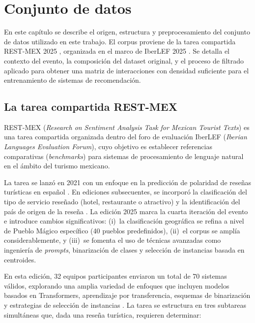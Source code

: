 \chapter{Conjunto de datos} \label{chap:dataset}

En este capítulo se describe el origen, estructura y preprocesamiento del conjunto de datos utilizado en este trabajo. El corpus proviene de la tarea compartida REST-MEX 2025 \citep{alvarez-carmona_overview_2025}, organizada en el marco de IberLEF 2025 \citep{gonzalez-barba_overview_2025}. Se detalla el contexto del evento, la composición del dataset original, y el proceso de filtrado aplicado para obtener una matriz de interacciones con densidad suficiente para el entrenamiento de sistemas de recomendación.

\section{La tarea compartida REST-MEX} \label{sec:restmex}

REST-MEX (\textit{Research on} \textit{Sentiment Analysis} \textit{Task} \textit{for Mexican Tourist Texts}) es una tarea compartida organizada dentro del foro de evaluación IberLEF (\textit{Iberian Languages Evaluation Forum}), cuyo objetivo es establecer referencias comparativas (\textit{benchmarks}) para sistemas de procesamiento de lenguaje natural en el ámbito del turismo mexicano.

La tarea se lanzó en 2021 con un enfoque en la predicción de polaridad de reseñas turísticas en español \citep{alvarez-carmona_overview_2021}. En ediciones subsecuentes, se incorporó la clasificación del tipo de servicio reseñado (hotel, restaurante o atractivo) \citep{alvarez-carmona_overview_2022} y la identificación del país de origen de la reseña \citep{alvarez-carmona_overview_2023}. La edición 2025 marca la cuarta iteración del evento e introduce cambios significativos: (i)~la clasificación geográfica se refina a nivel de Pueblo Mágico específico (40 pueblos predefinidos), (ii)~el corpus se amplía considerablemente, y (iii)~se fomenta el uso de técnicas avanzadas como ingeniería de \textit{prompts}, binarización de clases y selección de instancias basada en centroides.

En esta edición, 32 equipos participantes enviaron un total de 70 sistemas válidos, explorando una amplia variedad de enfoques que incluyen modelos basados en Transformers, aprendizaje por transferencia, esquemas de binarización y estrategias de selección de instancias \citep{alvarez-carmona_overview_2025}. La tarea se estructura en tres subtareas simultáneas que, dada una reseña turística, requieren determinar:

